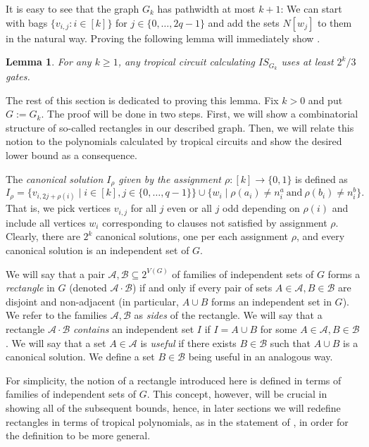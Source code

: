 \documentclass[11pt,a4paper]{article}
\newtheorem{lemma}{Lemma}[section]
\newcommand{\cA}{\mathcal{A}}
\newcommand{\cB}{\mathcal{B}}
\begin{document}
It is easy to see that the graph $G_k$ has pathwidth at most $k + 1$: We can start with bags $\{v_{i,j}:i \in [k]\}$ for $j \in \{0,\ldots,2q-1\}$ and add the sets $N[w_j]$ to them in the natural way. Proving the following lemma will immediately show .

\begin{lemma}\label{lem:mwis}
	For any $k \geq 1$, any tropical circuit calculating $IS_{G_k}$ uses at least $2^k / 3$ gates.
\end{lemma}

The rest of this section is dedicated to proving this lemma. Fix $k > 0$ and put $G := G_k$.
The proof will be done in two steps. First, we will show a combinatorial structure of so-called rectangles in our described graph. Then, we will relate this notion to the polynomials calculated by tropical circuits and show the desired lower bound as a consequence.

The \emph{canonical solution $I_\rho$ given by the assignment $\rho : [k] \to \{0, 1\}$} is defined as
\begin{equation*}
	I_\rho = \{ v_{i, 2j + \rho(i)} \mid i \in [k], j \in \{0, \dots, q-1\} \} \cup
	         \{ w_i \mid \rho(a_i) \neq n^a_i \ \text{and}\ \rho(b_i) \neq n^b_i \}.
\end{equation*}
That is, we pick vertices $v_{i,j}$ for all $j$ even or all $j$ odd depending on $\rho(i)$ and include all vertices $w_i$ corresponding to clauses not satisfied by assignment $\rho$. Clearly, there are $2^k$ canonical solutions, one per each assignment $\rho$, and every canonical solution is an independent set of $G$.

We will say that a pair $\cA, \cB \subseteq 2^{V(G)}$ of families of independent sets of $G$ forms a \emph{rectangle} in $G$ (denoted $\cA \cdot \cB$) if and only if every pair of sets $A \in \cA, B \in \cB$ are disjoint and non-adjacent (in particular, $A \cup B$ forms an independent set in $G$). We refer to the families $\cA, \cB$ as \emph{sides} of the rectangle. We will say that a rectangle $\cA \cdot \cB$ \emph{contains} an independent set $I$ if $I = A \cup B$ for some $A \in \cA, B \in \cB$. We will say that a set $A \in \cA$ is \emph{useful} if there exists $B \in \cB$ such that $A \cup B$ is a canonical solution. We define a set $B \in \cB$ being useful in an analogous way.

For simplicity, the notion of a rectangle introduced here is defined in terms of families of independent sets of $G$. This concept, however, will be crucial in showing all of the subsequent bounds, hence, in later sections we will redefine rectangles in terms of tropical polynomials, as in the statement of , in order for the definition to be more general.
\end{document}
